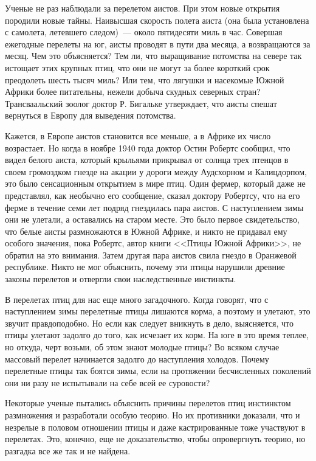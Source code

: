 \documentclass[12pt,a4paper,twoside,openany,svgnames]{memoir}
\begin{document}
Ученые не раз наблюдали за перелетом аистов. При этом новые открытия породили новые тайны. Наивысшая скорость полета аиста (она была установлена с самолета, летевшего следом)~--- около пятидесяти миль в час. Совершая ежегодные перелеты на юг, аисты проводят в пути два месяца, а возвращаются за месяц. Чем это объясняется? Тем ли, что выращивание потомства на севере так истощает этих крупных птиц, что они не могут за более короткий срок преодолеть шесть тысяч миль? Или тем, что лягушки и насекомые Южной Африки более питательны, нежели добыча скудных северных стран? Трансваальский зоолог доктор Р. Бигальке утверждает, что аисты спешат вернуться в Европу для выведения потомства.

Кажется, в Европе аистов становится все меньше, а в Африке их число возрастает. Но когда в ноябре 1940 года доктор Остин Робертс сообщил, что видел белого аиста, который крыльями прикрывал от солнца трех птенцов в своем громоздком гнезде на акации у дороги между Аудсхорном и Калицдорпом, это было сенсационным открытием в мире птиц. Один фермер, который даже не представлял, как необычно его сообщение, сказал доктору Робертсу, что на его ферме в течение семи лет подряд гнездилась пара аистов. С наступлением зимы они не улетали, а оставались на старом месте. Это было первое свидетельство, что белые аисты размножаются в Южной Африке, и никто не придавал ему особого значения, пока Робертс, автор книги <<Птицы Южной Африки>>, не обратил на это внимания. Затем другая пара аистов свила гнездо в Оранжевой республике. Никто не мог объяснить, почему эти птицы нарушили древние законы перелетов и отвергли свои наследственные инстинкты.

В перелетах птиц для нас еще много загадочного. Когда говорят, что с наступлением зимы перелетные птицы лишаются корма, а поэтому и улетают, это звучит правдоподобно. Но если как следует вникнуть в дело, выясняется, что птицы улетают задолго до того, как исчезает их корм. На юге в это время теплее, но откуда, черт возьми, об этом знают молодые птицы? Во всяком случае массовый перелет начинается задолго до наступления холодов. Почему перелетные птицы так боятся зимы, если на протяжении бесчисленных поколений они ни разу не испытывали на себе всей ее суровости?

Некоторые ученые пытались объяснить причины перелетов птиц инстинктом размножения и разработали особую теорию. Но их противники доказали, что и незрелые в половом отношении птицы и даже кастрированные тоже участвуют в перелетах. Это, конечно, еще не доказательство, чтобы опровергнуть теорию, но разгадка все же так и не найдена.
\end{document}
